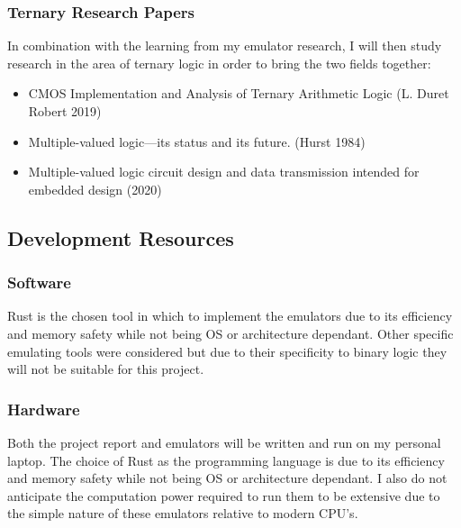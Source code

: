 \documentclass{article}
\begin{document}
\subsubsection{Ternary Research Papers}

In combination with the learning from my emulator research, I will then study research in the area of ternary 
logic in order to bring the two fields together:

\begin{itemize}
  \item CMOS Implementation and Analysis of Ternary Arithmetic Logic (L. Duret Robert 2019)
  \item Multiple-valued logic—its status and its future. (Hurst 1984)
  \item Multiple-valued logic circuit design and data transmission intended for embedded design (2020)
\end{itemize}

\subsection{Development Resources}

\subsubsection{Software}

Rust is the chosen tool in which to implement the emulators due to its efficiency and memory safety while not being OS or 
architecture dependant. Other specific emulating tools were considered but due to their specificity to binary logic they will not 
be suitable for this project.

\subsubsection{Hardware}

Both the project report and emulators will be written and run on my personal laptop. The choice of Rust as the 
programming language is due to its efficiency and memory safety while not being OS or 
architecture dependant. I also do not anticipate the computation power 
required to run them to be extensive due to the simple nature of these emulators relative to modern CPU's.

% 



\end{document}
